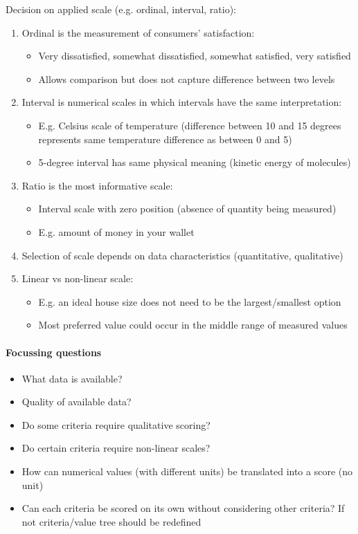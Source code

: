 \documentclass{article}
\begin{document}
Decision on applied scale (e.g. ordinal, interval, ratio):
\begin{enumerate}
    \item Ordinal is the measurement of consumers’ satisfaction:
    \begin{itemize}
        \item Very dissatisfied, somewhat dissatisfied, somewhat satisfied, very satisfied
        \item Allows comparison but does not capture difference between two levels
    \end{itemize}
    \item Interval is numerical scales in which intervals have the same interpretation:
    \begin{itemize}
        \item E.g. Celsius scale of temperature (difference between 10 and 15 degrees represents same temperature difference as between 0 and 5)
        \item 5-degree interval has same physical meaning (kinetic energy of molecules)
    \end{itemize}
    \item Ratio is the most informative scale:
    \begin{itemize}
        \item Interval scale with zero position (absence of quantity being measured)
        \item E.g. amount of money in your wallet
    \end{itemize}
    \item Selection of scale depends on data characteristics (quantitative, qualitative)
    \item Linear vs non-linear scale:
    \begin{itemize}
        \item E.g. an ideal house size does not need to be the largest/smallest option
        \item Most preferred value could occur in the middle range of measured values
    \end{itemize}
\end{enumerate}

\paragraph{Focussing questions}
\begin{itemize}
    \item What data is available?
    \item Quality of available data?
    \item Do some criteria require qualitative scoring?
    \item Do certain criteria require non-linear scales?
    \item How can numerical values (with different units) be translated into a score (no unit)
    \item Can each criteria be scored on its own without considering other criteria? If not criteria/value tree should be redefined
\end{itemize}
\end{document}
